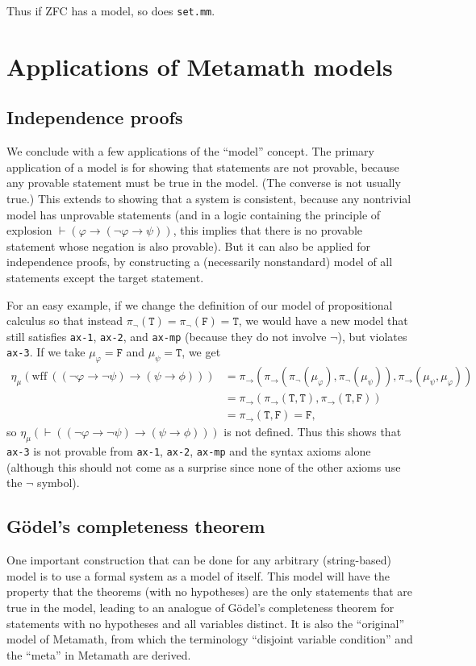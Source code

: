 \documentclass[runningheads,a4paper]{llncs}
\newcommand{\vph}{\varphi}
\newcommand{\tT}{\texttt{T}}
\newcommand{\tF}{\texttt{F}}
\begin{document}
Thus if \textsf{ZFC} has a model, so does \texttt{set.mm}.

\section{Applications of Metamath models}\label{sec:application}
\subsection{Independence proofs}\label{sec:independence}
We conclude with a few applications of the ``model'' concept. The primary application of a model is for showing that statements are not provable, because any provable statement must be true in the model. (The converse is not usually true.)  This extends to showing that a system is consistent, because any nontrivial model has unprovable statements (and in a logic containing the principle of explosion $\vdash(\vph\to(\lnot\vph\to\psi))$, this implies that there is no provable statement whose negation is also provable). But it can also be applied for independence proofs, by constructing a (necessarily nonstandard) model of all statements except the target statement.

For an easy example, if we change the definition of our model of propositional calculus so that instead $\pi_\lnot(\tT)=\pi_\lnot(\tF)=\tT$, we would have a new model that still satisfies \texttt{ax-1}, \texttt{ax-2}, and \texttt{ax-mp} (because they do not involve $\lnot$), but violates \texttt{ax-3}. If we take $\mu_\vph=\tF$ and $\mu_\psi=\tT$, we get
\begin{align*}
\eta_\mu(\textrm{wff}\ ((\lnot\vph\to\lnot\psi)\to(\psi\to\phi)))
&=\pi_\to(\pi_\to( \pi_\lnot(\mu_\vph),\pi_\lnot(\mu_\psi)), \pi_\to(\mu_\psi,\mu_\vph))\\
&=\pi_\to(\pi_\to(\tT,\tT), \pi_\to(\tT,\tF))\\
&=\pi_\to(\tT, \tF)=\tF,
\end{align*}
so $\eta_\mu(\vdash((\lnot\vph\to\lnot\psi)\to(\psi\to\phi)))$ is not defined. Thus this shows that \texttt{ax-3} is not provable from \texttt{ax-1}, \texttt{ax-2}, \texttt{ax-mp} and the syntax axioms alone (although this should not come as a surprise since none of the other axioms use the $\lnot$ symbol).

\subsection{G\"{o}del's completeness theorem}\label{sec:godel}
One important construction that can be done for any arbitrary (string-based) model is to use a formal system as a model of itself. This model will have the property that the theorems (with no hypotheses) are the only statements that are true in the model, leading to an analogue of G\"{o}del's completeness theorem for statements with no hypotheses and all variables distinct. It is also the ``original'' model of Metamath, from which the terminology ``disjoint variable condition'' and the ``meta'' in Metamath are derived.
\end{document}
